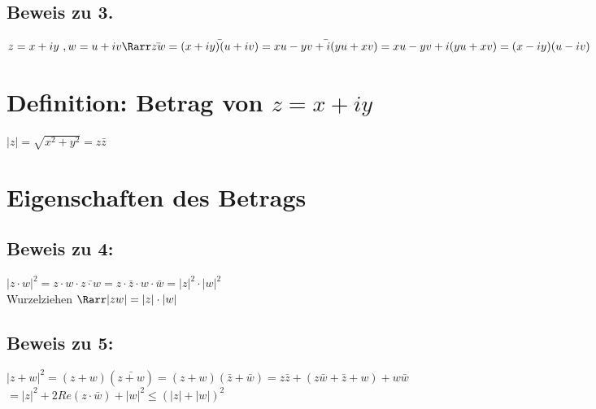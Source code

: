 %
\subsection{Beweis zu 3.}
$z = x+iy\ , w = u+iv \Rarr \bar{zw} = \bar{(x+iy) (u+iv)} = \bar{xu - yv + i(yu + xv)} = xu - yv + i(yu + xv) = (x-iy)(u-iv)$
\section{Definition: Betrag von $z = x+iy$}
$|z| = \sqrt{x^2 + y^2} = z\bar{z}$
\section{Eigenschaften des Betrags}
\subsection*{Beweis zu 4:}
$|z\cdot w|^2 = z\cdot w \cdot \bar{z\cdot w} = z\cdot \bar{z} \cdot w \cdot \bar{w} = |z|^2 \cdot |w|^2$\\
Wurzelziehen $\Rarr |zw| = |z|\cdot |w|$
\subsection*{Beweis zu 5:}
$|z+w|^2=(z+w)(\bar{z+w}) = (z+w)(\bar{z} + \bar{w}) = z\bar{z} + (z\bar{w} + \bar{z} + w)+ w\bar{w}$\\
$=|z|^2 + 2 Re(z\cdot \bar{w}) + |w|^2 ≤ (|z|+|w|)^2$
